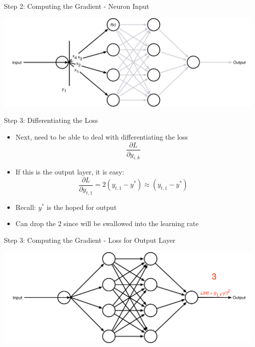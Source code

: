 \documentclass[aspectratio=169]{beamer}
\begin{document}
\begin{frame}{Step 2: Computing the Gradient - Neuron Input}

\includegraphics[width=1\textwidth]{lectBP/nnbpInput.pdf}
\end{frame}
\begin{frame}{Step 3: Differentiating the Loss}

\begin{itemize}
	\item Next, need to be able to deal with differentiating the loss
		$$\frac{\partial L}{\partial y_{i,k}}$$
	\item If this is the output layer, it is easy:
	$$\frac{\partial L}{\partial y_{t,1}} = 2 (y_{t,1} - y^{*}) \approx (y_{t,1} - y^{*})$$
	\item Recall: $y^*$ is the hoped for output
	\item Can drop the $2$ since will be swallowed into the learning rate
\end{itemize}
\end{frame}
\begin{frame}{Step 3: Computing the Gradient - Loss for Output Layer}

\includegraphics[width=1\textwidth]{lectBP/nnbpStep3.pdf}
\end{frame}
\end{document}

